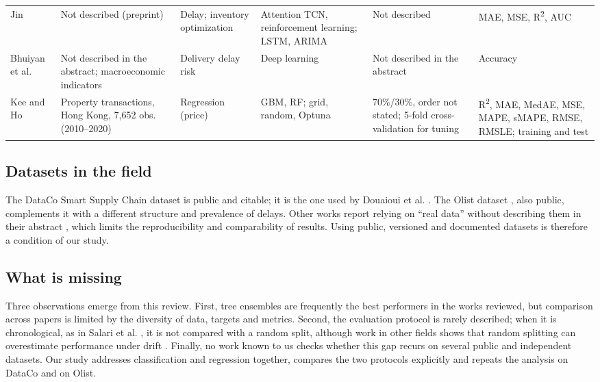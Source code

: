 \documentclass[11pt,a4paper]{article}
\theoremstyle{definition}
\begin{document}
\begin{table}[!htbp]
\begin{tabularx}{\textwidth}{@{}L{2.0cm}L{2.5cm}L{2.2cm}L{2.7cm}L{2.0cm}>{\raggedright\arraybackslash}X@{}}
Jin \cite{jin2025attention} & Not described (preprint) & Delay; inventory optimization & Attention TCN, reinforcement learning; LSTM, ARIMA & Not described & MAE, MSE, R\textsuperscript{2}, AUC \\
Bhuiyan et al. \cite{bhuiyan2026deep} & Not described in the abstract; macroeconomic indicators & Delivery delay risk & Deep learning & Not described in the abstract & Accuracy \\\midrule
Kee and Ho \cite{kee2025optimizing} & Property transactions, Hong Kong, 7{,}652 obs. (2010--2020) & Regression (price) & GBM, RF; grid, random, Optuna & 70\%/30\%, order not stated; 5-fold cross-validation for tuning & R\textsuperscript{2}, MAE, MedAE, MSE, MAPE, sMAPE, RMSE, RMSLE; training and test \\
\bottomrule
\end{tabularx}
\end{table}

\subsection{Datasets in the field}
\label{sec:rw-donnees}

The DataCo Smart Supply Chain dataset \cite{constante2019dataco} is public and citable; it is the one used by Douaioui et al. \cite{douaioui2024enhancing}. The Olist dataset \cite{olist2018brazilian}, also public, complements it with a different structure and prevalence of delays. Other works report relying on ``real data'' without describing them in their abstract \cite{rezki2024machine}, which limits the reproducibility and comparability of results. Using public, versioned and documented datasets is therefore a condition of our study.

\subsection{What is missing}
\label{sec:rw-lacune}

Three observations emerge from this review. First, tree ensembles are frequently the best performers in the works reviewed, but comparison across papers is limited by the diversity of data, targets and metrics. Second, the evaluation protocol is rarely described; when it is chronological, as in Salari et al. \cite{salari2022realtime}, it is not compared with a random split, although work in other fields shows that random splitting can overestimate performance under drift \cite{cerqueira2020evaluating}. Finally, no work known to us checks whether this gap recurs on several public and independent datasets. Our study addresses classification and regression together, compares the two protocols explicitly and repeats the analysis on DataCo and on Olist.
\end{document}
